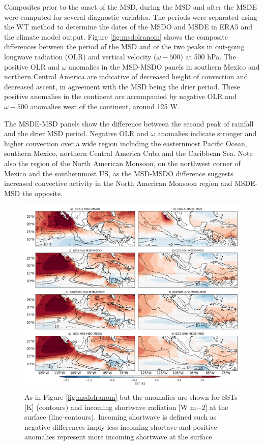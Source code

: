 Composites prior to the onset of the MSD, during the MSD and after the MSDE were computed for several diagnostic variables. The periods were separated using the WT method to determine the dates of the MSDO and MSDE in ERA5 and the climate model output.
Figure \ref{fig:msdolranom} shows the composite differences between the period of the MSD and of the two peaks in out-going longwave radiation (OLR) and vertical velocity ($\omega-500$) at 500 hPa.
The positive OLR and $\omega$ anomalies in the MSD-MSDO panels in southern Mexico and northern Central America are indicative of decreased height of convection and decreased ascent, in agreement with the MSD being the drier period. These positive anomalies in the continent are accompanied by negative OLR and $\omega-500$ anomalies west of the continent, around 125$^\circ$W. 


The MSDE-MSD panels show the difference between the second peak of rainfall and the drier MSD period. Negative OLR and $\omega$ anomalies indicate stronger and higher convection over a wide region including the easternmost Pacific Ocean, southern Mexico, northern Central America Cuba and the Caribbean Sea.  
Note also the region of the North American Monsoon, on the northwest corner of Mexico and the southernmost US, as the MSD-MSDO difference suggests increased convective activity in the North American Monsoon region and 
MSDE-MSD the opposite. 

 \begin{figure}[t!]
\includegraphics[width=\linewidth]{figures/fig4_sstdiff}
\caption{As in Figure \ref{fig:msdolranom} but the anomalies are shown for SSTs [K] (contours) and incoming shortwave radiation [W m${-2}$] at the surface (line-contours). Incoming shortwave is defined such as negative differences imply less incoming shortave and positive anomalies represent more incoming shortwave at the surface. }
\label{fig:msdsstanom}
\end{figure}

